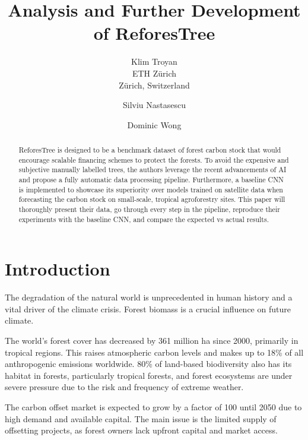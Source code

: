 \documentclass[10pt,twocolumn,letterpaper]{article}
\begin{document}
\title{Analysis and Further Development of ReforesTree}

\author{Klim Troyan\\
ETH Zürich\\
Zürich, Switzerland\\
\and
Silviu Nastasescu\\
\and
Dominic Wong\\
}
\maketitle

\begin{abstract}
    ReforesTree is designed to be a benchmark dataset of forest carbon stock that would encourage scalable financing schemes to protect the forests. To avoid the expensive and subjective manually labelled trees, the authors leverage the recent advancements of AI and propose a fully automatic data processing pipeline. Furthermore, a baseline CNN is implemented to showcase its superiority over models trained on satellite data when forecasting the carbon stock on small-scale, tropical agroforestry sites. This paper will thoroughly present their data, go through every step in the pipeline, reproduce their experiments with the baseline CNN, and compare the expected vs actual results.
\end{abstract}

\section{Introduction}
\label{sec:intro}
The degradation of the natural world is unprecedented in human history and a vital driver of the climate crisis. Forest biomass is a crucial influence on future climate.

The world's forest cover has decreased by 361 million ha since 2000, primarily in tropical regions. This raises atmospheric carbon levels and makes up to 18\% of all anthropogenic emissions worldwide. 80\% of land-based biodiversity also has its habitat in forests, particularly tropical forests, and forest ecosystems are under severe pressure due to the risk and frequency of extreme weather.

The carbon offset market is expected to grow by a factor of 100 until 2050 due to high demand and available capital. The main issue is the limited supply of offsetting projects, as forest owners lack upfront capital and market access.\textbf{}
\end{document}
